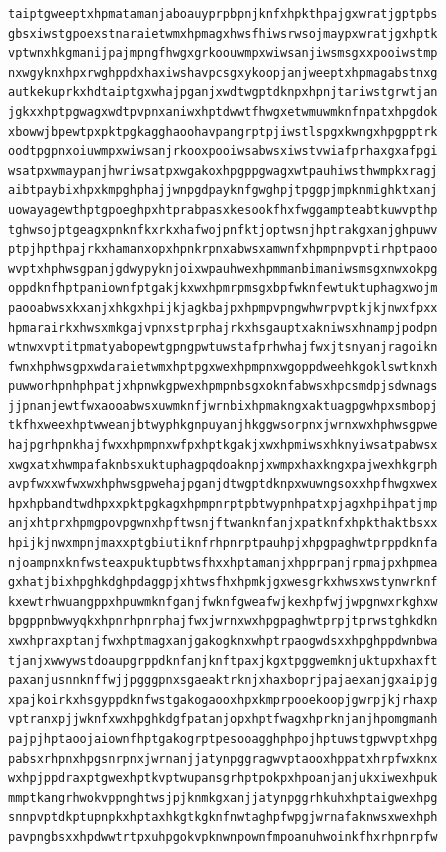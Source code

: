 \documentclass[11pt,letterpaper]{exam}
\begin{document}
\begin{questions}
\begin{verbatim}
taiptgweeptxhpmatamanjaboauyprpbpnjknfxhpkthpajgxwratjgptpbs
gbsxiwstgpoexstnaraietwmxhpmagxhwsfhiwsrwsojmaypxwratjgxhptk
vptwnxhkgmanijpajmpngfhwgxgrkoouwmpxwiwsanjiwsmsgxxpooiwstmp
nxwgyknxhpxrwghppdxhaxiwshavpcsgxykoopjanjweeptxhpmagabstnxg
autkekuprkxhdtaiptgxwhajpganjxwdtwgptdknpxhpnjtariwstgrwtjan
jgkxxhptpgwagxwdtpvpnxaniwxhptdwwtfhwgxetwmuwmknfnpatxhpgdok
xbowwjbpewtpxpktpgkagghaoohavpangrptpjiwstlspgxkwngxhpgpptrk
oodtpgpnxoiuwmpxwiwsanjrkooxpooiwsabwsxiwstvwiafprhaxgxafpgi
wsatpxwmaypanjhwriwsatpxwgakoxhpgppgwagxwtpauhiwsthwmpkxragj
aibtpaybixhpxkmpghphajjwnpgdpayknfgwghpjtpggpjmpknmighktxanj
uowayagewthptgpoeghpxhtprabpasxkesookfhxfwggampteabtkuwvpthp
tghwsojptgeagxpnknfkxrkxhafwojpnfktjoptwsnjhptrakgxanjghpuwv
ptpjhpthpajrkxhamanxopxhpnkrpnxabwsxamwnfxhpmpnpvptirhptpaoo
wvptxhphwsgpanjgdwypyknjoixwpauhwexhpmmanbimaniwsmsgxnwxokpg
oppdknfhptpaniownfptgakjkxwxhpmrpmsgxbpfwknfewtuktuphagxwojm
paooabwsxkxanjxhkgxhpijkjagkbajpxhpmpvpngwhwrpvptkjkjnwxfpxx
hpmarairkxhwsxmkgajvpnxstprphajrkxhsgauptxakniwsxhnampjpodpn
wtnwxvptitpmatyabopewtgpngpwtuwstafprhwhajfwxjtsnyanjragoikn
fwnxhphwsgpxwdaraietwmxhptpgxwexhpmpnxwgoppdweehkgoklswtknxh
puwworhpnhphpatjxhpnwkgpwexhpmpnbsgxoknfabwsxhpcsmdpjsdwnags
jjpnanjewtfwxaooabwsxuwmknfjwrnbixhpmakngxaktuagpgwhpxsmbopj
tkfhxweexhptwweanjbtwyphkgnpuyanjhkggwsorpnxjwrnxwxhphwsgpwe
hajpgrhpnkhajfwxxhpmpnxwfpxhptkgakjxwxhpmiwsxhknyiwsatpabwsx
xwgxatxhwmpafaknbsxuktuphagpqdoaknpjxwmpxhaxkngxpajwexhkgrph
avpfwxxwfwxwxhphwsgpwehajpganjdtwgptdknpxwuwngsoxxhpfhwgxwex
hpxhpbandtwdhpxxpktpgkagxhpmpnrptpbtwypnhpatxpjagxhpihpatjmp
anjxhtprxhpmgpovpgwnxhpftwsnjftwanknfanjxpatknfxhpkthaktbsxx
hpijkjnwxmpnjmaxxptgbiutiknfrhpnrptpauhpjxhpgpaghwtprppdknfa
njoampnxknfwsteaxpuktupbtwsfhxxhptamanjxhpprpanjrpmajpxhpmea
gxhatjbixhpghkdghpdaggpjxhtwsfhxhpmkjgxwesgrkxhwsxwstynwrknf
kxewtrhwuangppxhpuwmknfganjfwknfgweafwjkexhpfwjjwpgnwxrkghxw
bpgppnbwwyqkxhpnrhpnrphajfwxjwrnxwxhpgpaghwtprpjtprwstghkdkn
xwxhpraxptanjfwxhptmagxanjgakogknxwhptrpaogwdsxxhpghppdwnbwa
tjanjxwwywstdoaupgrppdknfanjknftpaxjkgxtpggwemknjuktupxhaxft
paxanjusnnknffwjjpgggpnxsgaeaktrknjxhaxboprjpajaexanjgxaipjg
xpajkoirkxhsgyppdknfwstgakogaooxhpxkmprpooekoopjgwrpjkjrhaxp
vptranxpjjwknfxwxhpghkdgfpatanjopxhptfwagxhprknjanjhpomgmanh
pajpjhptaoojaiownfhptgakogrptpesooagghphpojhptuwstgpwvptxhpg
pabsxrhpnxhpgsnrpnxjwrnanjjatynpggragwvptaooxhppatxhrpfwxknx
wxhpjppdraxptgwexhptkvptwupansgrhptpokpxhpoanjanjukxiwexhpuk
mmptkangrhwokvppnghtwsjpjknmkgxanjjatynpggrhkuhxhptaigwexhpg
snnpvptdkptupnpkxhptaxhkgtkgknfnwtaghpfwpgjwrnafaknwsxwexhph
pavpngbsxxhpdwwtrtpxuhpgokvpknwnpownfmpoanuhwoinkfhxrhpnrpfw

\end{verbatim}
\end{questions}
\end{document}
